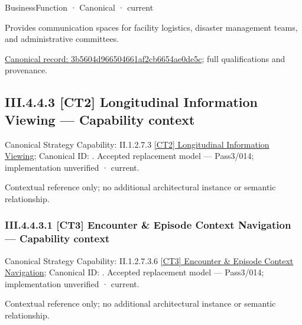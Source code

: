 \label{navigation:III.4.4.2.1.4.2.1}

\label{element:3b5604d966504661af2cb6654ae0de5c}
{\small BusinessFunction · Canonical · current}\par

Provides communication spaces for facility logistics, disaster management teams, and administrative committees.


{\footnotesize \href{../../../../../../../continuum/business/business-function/3b5604d966504661af2cb6654ae0de5c.md}{Canonical record: 3b5604d966504661af2cb6654ae0de5c}; full qualifications and provenance.}\par
\subsection*{III.4.4.3 [CT2] Longitudinal Information Viewing — Capability context}
\label{navigation:III.4.4.3}

{\small Canonical Strategy Capability: II.1.2.7.3 \hyperref[element:b47f58042730497daf37e418ac865bb3]{[CT2] Longitudinal Information Viewing}; Canonical ID: \texttt{}. Accepted replacement model — Pass3/014; implementation unverified · current.}\par
Contextual reference only; no additional architectural instance or semantic relationship.\par
\subsubsection*{III.4.4.3.1 [CT3] Encounter \& Episode Context Navigation — Capability context}
\label{navigation:III.4.4.3.1}

{\small Canonical Strategy Capability: II.1.2.7.3.6 \hyperref[element:bfed62e152d742a3be947e824892064a]{[CT3] Encounter \& Episode Context Navigation}; Canonical ID: \texttt{}. Accepted replacement model — Pass3/014; implementation unverified · current.}\par
Contextual reference only; no additional architectural instance or semantic relationship.\par
